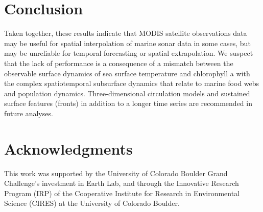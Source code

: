 \documentclass[10pt,letterpaper]{article}
\begin{document}
\section*{Conclusion}

Taken together, these results indicate that MODIS satellite observations data may be useful for spatial interpolation of marine sonar data in some cases, but may be unreliable for temporal forecasting or spatial extrapolation.
We suspect that the lack of performance is a consequence of a mismatch between the observable surface dynamics of sea surface temperature and chlorophyll a with the complex spatiotemporal subsurface dynamics that relate to marine food webs and population dynamics.
Three-dimensional circulation models and sustained surface features (fronts) in addition to a longer time series are recommended in future analyses.

\section*{Acknowledgments}
This work was supported by the University of Colorado Boulder Grand Challenge's investment in Earth Lab, and through the Innovative Research Program (IRP) of the Cooperative Institute for Research in Environmental Science (CIRES) at the University of Colorado Boulder.

\nolinenumbers

%
%
%






\end{document}
